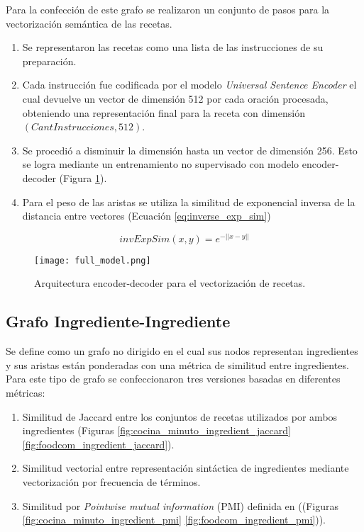 \documentclass[
	a4paper, %
	10pt, %
	unnumberedsections, %
	twoside, %
]{LTJournalArticle}
\begin{document}
Para la confección de este grafo se realizaron un conjunto de pasos para la vectorización semántica de las recetas.

\begin{enumerate}
	\item Se representaron las recetas como una lista de las instrucciones de su preparación.
	\item Cada instrucción fue codificada por el modelo \textit{Universal Sentence Encoder} \autocite{cer2018universal}
	el cual devuelve un vector de dimensión 512 por cada oración procesada, obteniendo una representación final
	para la receta con dimensión $(CantInstrucciones, 512)$. 
	\item Se procedió a disminuir la dimensión hasta un vector de dimensión 256. Esto se logra mediante un 
	entrenamiento no supervisado con modelo encoder-decoder (Figura \ref{fig:encoder_decoder_small}).
	\item Para el peso de las aristas se utiliza la similitud de exponencial inversa de la distancia entre vectores 
	(Ecuación \ref{eq:inverse_exp_sim})
\end{enumerate}

\begin{equation}
	invExpSim(x, y) = e^{-||x-y||}
	\label{eq:inverse_exp_sim}
\end{equation}

\begin{figure}
	\texttt{[image: full\_model.png]}
	\caption{Arquitectura encoder-decoder para el vectorización de recetas.}
	\label{fig:encoder_decoder_small}
\end{figure}

\subsection{Grafo Ingrediente-Ingrediente}

Se define como un grafo no dirigido en el cual sus nodos representan ingredientes y sus aristas
están ponderadas con una métrica de similitud entre ingredientes. 
Para este tipo de grafo se confeccionaron tres versiones basadas en diferentes métricas:

\begin{enumerate}
	\item Similitud de Jaccard entre los conjuntos de recetas utilizados por ambos ingredientes (Figuras \ref{fig:cocina_minuto_ingredient_jaccard} \ref{fig:foodcom_ingredient_jaccard}).
	\item Similitud vectorial entre representación sintáctica de ingredientes mediante vectorización 
	por frecuencia de términos.
	\item Similitud por \textit{Pointwise mutual information} (PMI) definida en \textcite{teng2012recipe} ((Figuras \ref{fig:cocina_minuto_ingredient_pmi} \ref{fig:foodcom_ingredient_pmi})).
\end{enumerate}
\end{document}

